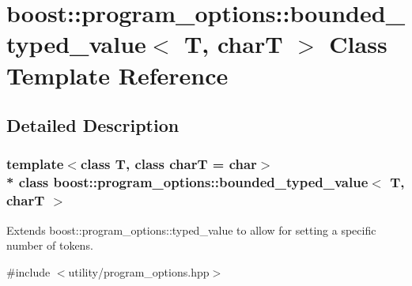 \hypertarget{classboost_1_1program__options_1_1bounded__typed__value}{}\section{boost\+:\+:program\+\_\+options\+:\+:bounded\+\_\+typed\+\_\+value$<$ T, charT $>$ Class Template Reference}
\label{classboost_1_1program__options_1_1bounded__typed__value}


\subsection{Detailed Description}
\subsubsection*{template$<$class T, class charT = char$>$\\*
class boost\+::program\+\_\+options\+::bounded\+\_\+typed\+\_\+value$<$ T, char\+T $>$}

Extends boost\+::program\+\_\+options\+::typed\+\_\+value to allow for setting a specific number of tokens. 

{\ttfamily \#include $<$utility/program\+\_\+options.\+hpp$>$}


